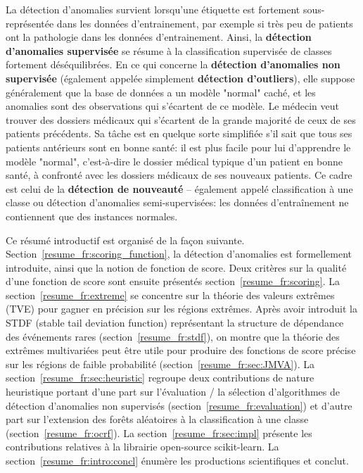 \documentclass[a4paper, 12pt]{article}
\begin{document}
La détection d'anomalies survient lorsqu'une étiquette est fortement sous-représentée dans les données d'entrainement, par exemple si très peu de patients ont la pathologie dans les données d'entrainement.
Ainsi, la \textbf{détection d'anomalies supervisée} se résume à la classification supervisée de classes fortement déséquilibrées.
En ce qui concerne la \textbf {détection d'anomalies non supervisée} (également appelée simplement \textbf{détection d'outliers}), elle suppose généralement que la base de données a un modèle "normal" caché, et les anomalies sont des observations qui s'écartent de ce modèle. Le médecin veut trouver des dossiers médicaux qui s'écartent de la grande majorité de ceux de ses patients précédents.
%
Sa tâche est en quelque sorte simplifiée s'il sait que tous ses patients antérieurs sont en bonne santé: il est plus facile pour lui d'apprendre le modèle "normal", c'est-à-dire le dossier médical typique d'un patient en bonne santé, à confronté avec les dossiers médicaux de ses nouveaux patients. Ce cadre est celui de la \textbf {détection de nouveauté} -- également appelé classification à une classe ou détection d'anomalies semi-supervisées: les données d'entraînement ne contiennent que des instances normales.

Ce résumé introductif est organisé de la façon suivante.
Section~\ref{resume_fr:scoring_function}, la détection d'anomalies est formellement introduite, ainsi que la notion de fonction de score.
Deux critères sur la qualité d'une fonction de score sont ensuite présentés section~\ref{resume_fr:scoring}.
La section~\ref{resume_fr:extreme} se concentre sur la théorie des valeurs extrêmes (TVE) pour gagner en précision sur les régions extrêmes. Après avoir introduit la STDF (stable tail deviation function) représentant la structure de dépendance des événements rares (section~\ref{resume_fr:stdf}), on montre que la théorie des extrêmes multivariées peut être utile pour produire des fonctions de score précise sur les régions de faible probabilité (section~\ref{resume_fr:sec:JMVA}).
La section~\ref{resume_fr:sec:heuristic} regroupe deux contributions de nature heuristique portant d'une part sur l'évaluation / la sélection d'algorithmes de détection d'anomalies non supervisés (section~\ref{resume_fr:evaluation}) et d'autre part sur l'extension des forêts aléatoires à la classification à une classe (section~\ref{resume_fr:ocrf}). La section~\ref{resume_fr:sec:impl} présente les contributions relatives à la librairie open-source scikit-learn. La section~\ref{resume_fr:intro:concl} énumère les productions scientifiques et conclut.
\end{document}
